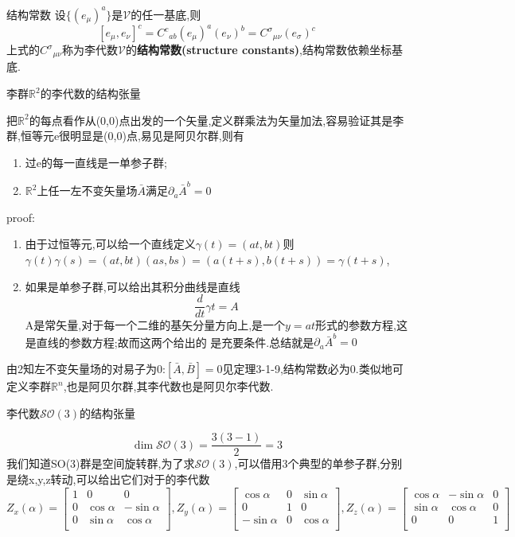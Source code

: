 \documentclass[../main.tex]{subfiles}
\begin{document}
 \begin{definition}
   {}{结构常数}
 设$\{(e_\mu)^a\}$是$\mathscr{V}$的任一基底,则
 $$[e_\mu,e_\nu]^c = C^c{}_{ab}(e_\mu)^a(e_\nu)^b = C^\sigma{}_{\mu\nu}(e_\sigma)^c$$
 上式的$C^\sigma{}_{\mu\nu}$称为李代数$\mathscr{V}$的\textbf{结构常数(structure constants)},结构常数依赖坐标基底.
 \end{definition}
 \begin{example}
   \label{G-6-1}
     李群$\mathbb{R}^2$的李代数的结构张量
 \end{example}
     把$\mathbb{R}^2$的每点看作从(0,0)点出发的一个矢量,定义群乘法为矢量加法,容易验证其是李群,恒等元e很明显是(0,0)点,易见是阿贝尔群,则有
     \begin{enumerate}
         \item 过e的每一直线是一单参子群;
         \item $\mathbb{R}^2$上任一左不变矢量场$\bar{A}$满足$\partial_a\bar{A}^b = 0$
     \end{enumerate}
 proof:\begin{enumerate}
     \item 由于过恒等元,可以给一个直线定义$\gamma(t) = (at,bt)$则$\gamma(t)\gamma(s) = (at,bt)(as,bs) = (a(t+s),b(t+s)) = \gamma(t+s)$,
     \item 如果是单参子群,可以给出其积分曲线是直线$$\frac{d}{dt} \gamma{t}= A$$A是常矢量,对于每一个二维的基矢分量方向上,是一个$y =at$形式的参数方程,这是直线的参数方程;故而这两个给出的
     是充要条件.总结就是$\partial_a\bar{A}^b = 0$ 
 \end{enumerate}
    由2知左不变矢量场的对易子为0:$[\bar{A},\bar{B}] = 0$见定理3-1-9,结构常数必为0.类似地可定义李群$\mathbb{R}^n$,也是阿贝尔群,其李代数也是阿贝尔李代数. 
    \begin{example}
      \label{G-6-2}
     李代数$\mathscr{SO}(3)$的结构张量
    \end{example}
 $$\dim \mathscr{SO}(3) = \frac{3(3-1)}{2}=3$$我们知道SO(3)群是空间旋转群,为了求$\mathscr{SO}(3)$,可以借用3个典型的单参子群,分别是绕x,y,z转动,可以给出它们对于的李代数
 $$Z_x(\alpha)= \begin{bmatrix}
     1&0&0\\
     0&\cos \alpha& -\sin \alpha\\
     0&\sin \alpha& \cos \alpha\\
 \end{bmatrix},
 Z_y(\alpha)= \begin{bmatrix}
     \cos \alpha& 0&\sin \alpha\\
     0&1&0\\
     -\sin \alpha&0& \cos \alpha\\
 \end{bmatrix},
 Z_z(\alpha)= \begin{bmatrix}
     \cos \alpha& -\sin \alpha&0\\
     \sin \alpha& \cos \alpha&0\\
     0&0&1\\
 \end{bmatrix}$$
\end{document}
